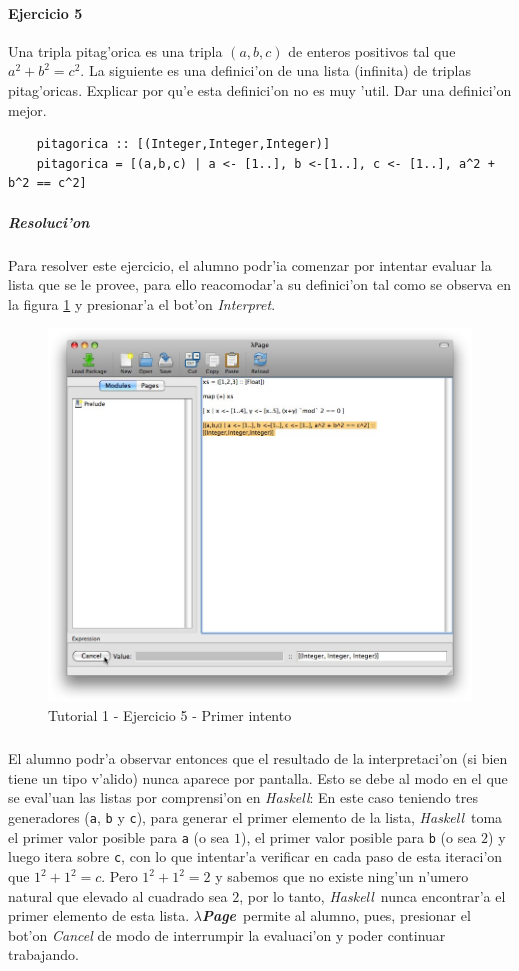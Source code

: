 \documentclass[a4paper]{article}
\newcommand{\haskell}{\textsl{Haskell}}
\newcommand{\hpage}{\textbf{\textsl{$\lambda$Page}}}
\begin{document}
\paragraph{Ejercicio 5}Una tripla pitag'orica es una tripla $(a,b,c)$ de enteros positivos tal que $a^{2} + b^{2} = c^{2}$.  La siguiente es una definici'on de una lista (infinita) de triplas pitag'oricas.  Explicar por qu'e esta definici'on no es muy 'util.  Dar una definici'on mejor.
\begin{center}\begin{lstlisting}
	pitagorica :: [(Integer,Integer,Integer)] 
	pitagorica = [(a,b,c) | a <- [1..], b <-[1..], c <- [1..], a^2 + b^2 == c^2]
\end{lstlisting}\end{center}
\subparagraph{Resoluci'on}Para resolver este ejercicio, el alumno podr'ia comenzar por intentar evaluar la lista que se le provee, para ello reacomodar'a su definici'on tal como se observa en la figura \ref{tut103} y presionar'a el bot'on \textsl{Interpret}.
\begin{figure}[hp]
	\begin{center}
        	\includegraphics[width=.75\textwidth]{pictures/tut1/03}
		\caption{Tutorial 1 - Ejercicio 5 - Primer intento}
		\label{tut103}
	\end{center}
\end{figure}
\subparagraph{}El alumno podr'a observar entonces que el resultado de la interpretaci'on (si bien tiene un tipo v'alido) nunca aparece por pantalla.  Esto se debe al modo en el que se eval'uan las listas por comprensi'on en \haskell: En este caso teniendo tres generadores (\texttt{a}, \texttt{b} y \texttt{c}), para generar el primer elemento de la lista, \haskell\ toma el primer valor posible para \texttt{a} (o sea $1$), el primer valor posible para \texttt{b} (o sea $2$) y luego itera sobre \texttt{c}, con lo que intentar'a verificar en cada paso de esta iteraci'on que $1^{2} + 1^{2} = c$.  Pero $1^{2}+1^{2} = 2$ y sabemos que no existe ning'un n'umero natural que elevado al cuadrado sea $2$, por lo tanto, \haskell\ nunca encontrar'a el primer elemento de esta lista.  \hpage\ permite al alumno, pues, presionar el bot'on \textsl{Cancel} de modo de interrumpir la evaluaci'on y poder continuar trabajando.
\end{document}
